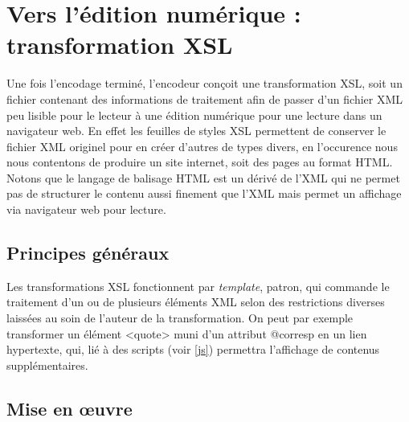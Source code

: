 \documentclass[12pt, a4paper]{article}
\begin{document}






\section{Vers l'édition numérique : transformation XSL}
\label{ref:xsl_gen}
Une fois l'encodage terminé, l'encodeur conçoit une transformation XSL, soit un fichier contenant des informations de traitement afin de passer d'un fichier XML peu lisible pour le lecteur à une édition numérique pour une lecture dans un navigateur web. En effet les feuilles de styles XSL permettent de conserver le fichier XML originel pour en créer d'autres de types divers, en l'occurence nous nous contentons de produire un site internet, soit des pages au format HTML. Notons que le langage de balisage HTML est un dérivé de l'XML qui ne permet pas de structurer le contenu aussi finement que l'XML mais permet un affichage via navigateur web pour lecture.
    \subsection{Principes généraux}
Les transformations XSL fonctionnent par \textit{template}, patron, qui commande le traitement d'un ou de plusieurs éléments XML selon des restrictions diverses laissées au soin de l'auteur de la transformation. On peut par exemple transformer un élément <quote> muni d'un attribut @corresp en un lien hypertexte, qui, lié à des scripts (voir \ref{js}) permettra l'affichage de contenus supplémentaires. 
    \subsection{Mise en œuvre}
\end{document}
